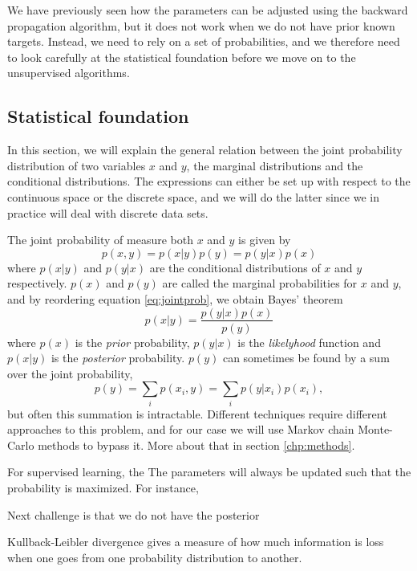 We have previously seen how the parameters can be adjusted using the backward propagation algorithm, but it does not work when we do not have prior known targets. Instead, we need to rely on a set of probabilities, and we therefore need to look carefully at the statistical foundation before we move on to the unsupervised algorithms.

\subsection{Statistical foundation}
In this section, we will explain the general relation between the joint probability distribution of two variables $x$ and $y$, the marginal distributions and the conditional distributions. The expressions can either be set up with respect to the continuous space or the discrete space, and we will do the latter since we in practice will deal with discrete data sets. 

The joint probability of measure both $x$ and $y$ is given by
\begin{equation}
p(x,y)=p(x|y)p(y)=p(y|x)p(x)
\label{eq:jointprob}
\end{equation}
where $p(x|y)$ and $p(y|x)$ are the conditional distributions of $x$ and $y$ respectively. $p(x)$ and $p(y)$ are called the marginal probabilities for $x$ and $y$, and by reordering equation \eqref{eq:jointprob}, we obtain Bayes' theorem
\begin{equation}
p(x|y)=\frac{p(y|x)p(x)}{p(y)}
\end{equation}
where $p(x)$ is the \textit{prior} probability, $p(y|x)$ is the \textit{likelyhood} function and $p(x|y)$ is the \textit{posterior} probability. $p(y)$ can sometimes be found by a sum over the joint probability,
\begin{equation}
p(y)=\sum_i p(x_i,y) = \sum_i p(y|x_i)p(x_i),
\end{equation}
but often this summation is intractable. Different techniques require different approaches to this problem, and for our case we will use Markov chain Monte-Carlo methods to bypass it. More about that in section \eqref{chp:methods}. 

For supervised learning, the 
The parameters will always be updated such that the probability is maximized. For instance, 

Next challenge is that we do not have the posterior

Kullback-Leibler divergence gives a measure of how much information is loss when one goes from one probability distribution to another. 

